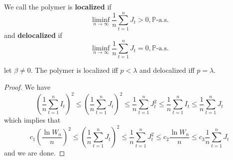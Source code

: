 \begin{definition}
    We call the polymer is \textbf{localized} if
    \[
    \liminf_{n\to\infty}\dfrac{1}{n}\sum\limits_{t=1}^n J_t > 0,\mathbb{P}\text{-a.s.}
    \]
    and \textbf{delocalized} if
    \[
    \liminf_{n\to\infty}\dfrac{1}{n}\sum\limits_{t=1}^n J_t = 0,\mathbb{P}\text{-a.s.}
    \]
\end{definition}

\begin{theorem}
    let $\beta \neq 0$. The polymer is localized iff $p<\lambda$ and delocalized iff $p=\lambda$.
\end{theorem}
\begin{proof}
    We have
    \[
    \left(\dfrac{1}{n}\sum\limits_{t=1}^n I_t\right)^2 \leq \left(\dfrac{1}{n}\sum\limits_{t=1}^n J_t\right)^2 \leq \dfrac{1}{n}\sum\limits_{t=1}^n J_t^2 \leq \dfrac{1}{n}\sum\limits_{t=1}^n I_t \leq \dfrac{1}{n}\sum\limits_{t=1}^n J_t
    \]
    which implies that
    \[
    c_1\left(\dfrac{\ln W_n}{n}\right)^2 \leq \left(\dfrac{1}{n}\sum\limits_{t=1}^n J_t\right)^2 \leq \dfrac{1}{n}\sum\limits_{t=1}^n J_t^2 \leq c_2 \dfrac{\ln W_n}{n} \leq c_3 \dfrac{1}{n}\sum\limits_{t=1}^n J_t
    \]
    and we are done.
\end{proof}

